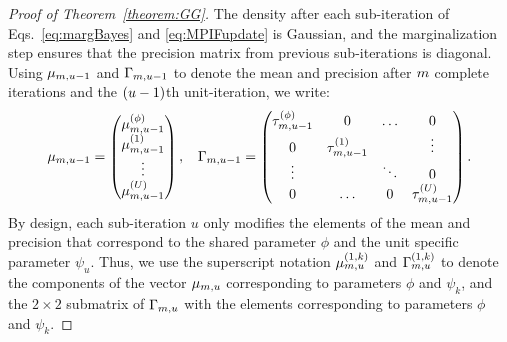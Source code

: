 \documentclass[12pt]{article}\usepackage[]{graphicx}\usepackage[]{xcolor}
\begin{document}
\begin{appendices}
\begin{proof}[Proof of Theorem~\ref{theorem:GG}]
The density after each sub-iteration of Eqs.~\ref{eq:margBayes} and \ref{eq:MPIFupdate} is Gaussian, and the marginalization step ensures that the precision matrix from previous sub-iterations is diagonal.
Using $\mu_{m, u-1}$ and $\Gamma_{m, u-1}$ to denote the mean and precision after $m$ complete iterations and the $(u-1)$th unit-iteration, we write:
\begin{align*}
    \mu_{m, u - 1} = \begin{pmatrix}
        \mu_{m, u-1}^{(\phi)} \\
        \mu_{m, u-1}^{(1)} \\
        \vdots \\
        \mu_{m, u-1}^{(U)}
    \end{pmatrix}, \, \, \hspace{2mm} \Gamma_{m, u-1} = \begin{pmatrix}
        \tau^{(\phi)}_{m, u-1} & 0 & \ldots & 0 \\
        0 & \tau^{(1)}_{m, u-1} & & \vdots \\
        \vdots & & \ddots & 0\\
        0 & \ldots & 0 & \tau^{(U)}_{m, u-1}
    \end{pmatrix}.
\end{align*}
By design, each sub-iteration $u$ only modifies the elements of the mean and precision that correspond to the shared parameter $\phi$ and the unit specific parameter $\psi_u$. Thus, we use the superscript notation $\mu_{m, u}^{(1, k)}$ and $\Gamma_{m, u}^{(1, k)}$ to denote the components of the vector $\mu_{m, u}$ corresponding to parameters $\phi$ and $\psi_k$, and the $2\times 2$ submatrix of $\Gamma_{m, u}$ with the elements corresponding to parameters $\phi$ and $\psi_k$.


\end{proof}
\end{appendices}
\end{document}
